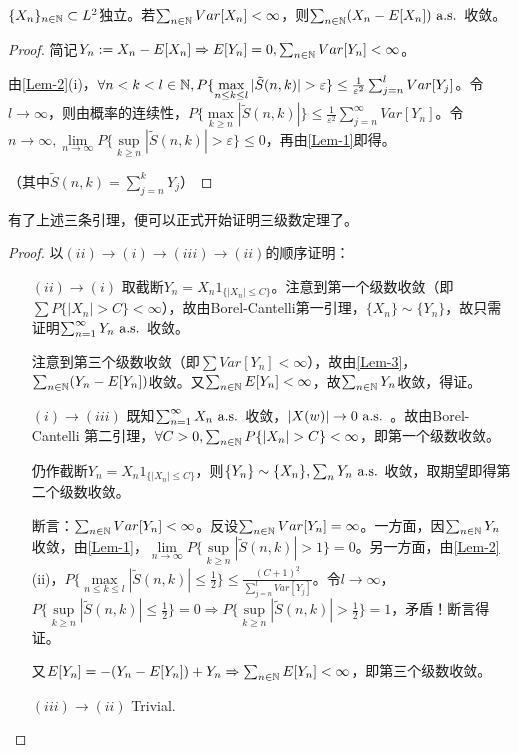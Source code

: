 \documentclass{ctexbook}
\begin{document}
\begin{Lemma}\label{Lem-3}
  $\{X_{n}\}_{n\in\mathbb{N}}\subset L^{2}$独立。若$\sum_{n\in\mathbb{N}}Var[X_{n}]<\infty$，则$\sum_{n\in\mathbb{N}}(X_{n}-E[X_{n}])\text{ a.s. }$收敛。
\end{Lemma}
\begin{proof}
 简记$Y_{n}:=X_{n}-E[X_{n}]\Rightarrow E[Y_{n}]=0,\sum_{n\in\mathbb{N}}Var[Y_{n}]<\infty$。

  由\ref{Lem-2}(i)，$\forall n<k<l\in\N, P\{\max\limits_{n\leq k\leq l}|\tilde S(n,k)|>\varepsilon\}\leq \frac{1}{\varepsilon^{2}}\sum_{j=n}^{l}Var[Y_{j}]$。令$l\to\infty$，则由概率的连续性，$P\{\max\limits_{k\geq n}|\tilde{S}(n,k)|\}\leq\frac{1}{\varepsilon^{2}}\sum_{j=n}^{\infty}Var[Y_{n}]$。令$n\to\infty, \lim\limits_{n\to\infty}P\{\sup\limits_{k\geq n}|\tilde{S}(n,k)|>\varepsilon\}\leq 0$，再由\ref{Lem-1}即得。
  
  （其中$\tilde S(n,k)=\sum_{j=n}^{k}Y_{j}$）
\end{proof}
有了上述三条引理，便可以正式开始证明三级数定理了。
\begin{proof}
以$(ii)\to(i)\to (iii)\to (ii)$的顺序证明：
  \begin{itemize}
  \item[$(ii)\to (i)$] 取截断$Y_{n}=X_{n}1_{\{|X_{n}|\leq C\}}$。注意到第一个级数收敛（即$\sum P\{|X_{n}|>C\}<\infty$），故由Borel-Cantelli第一引理，$\{X_{n}\}\sim \{Y_{n}\}$，故只需证明$\sum_{n=1}^{\infty}Y_{n}\text{ a.s. }$收敛。

    注意到第三个级数收敛（即$\sum Var[Y_{n}]<\infty$），故由\ref{Lem-3}，$\sum_{n\in\mathbb{N}}(Y_{n}-E[Y_{n}])$收敛。又$\sum_{n\in\mathbb{N}}E[Y_{n}]<\infty$，故$\sum_{n\in\mathbb{N}} Y_{n}$收敛，得证。

  \item[$(i)\to (iii)$] 既知$\sum_{n=1}^{\infty} X_{n}\text{ a.s. }$收敛，$|X(w)|\to 0\text{ a.s. }$。故由Borel-Cantelli 第二引理，$\forall C>0,\sum_{n\in\N} P\{|X_{n}|>C\}<\infty$，即第一个级数收敛。

    仍作截断$Y_{n}=X_{n}1_{\{|X_{n}|\leq C\}}$，则$\{Y_{n}\}\sim\{X_{n}\},\sum_{n}Y_{n}\text{ a.s. }$收敛，取期望即得第二个级数收敛。

    断言：$\sum_{n\in\mathbb{N}} Var[Y_{n}]<\infty$。反设$\sum_{n\in\mathbb{N}}Var[Y_{n}]=\infty$。一方面，因$\sum_{n\in\mathbb{N}} Y_{n}$收敛，由\ref{Lem-1}，$\lim\limits_{n\to\infty}P\{\sup\limits_{k\geq n}|\tilde{S}(n,k)|>1\}=0$。另一方面，由\ref{Lem-2}(ii)，$P\{\max\limits_{n\leq k\leq l}|\tilde{S}(n,k)|\leq\frac{1}{2}\}\leq\frac{(C+1)^{2}}{\sum_{j=n}^{l}Var[Y_{j}]}$。令$l\to\infty$，$P\{\sup\limits_{k\geq n}|\tilde S(n,k)|\leq \frac{1}{2}\}=0\Rightarrow P\{\sup\limits_{k\geq n}|\tilde{S}(n,k)|>\frac{1}{2}\}=1$，矛盾！断言得证。

    又$E[Y_{n}]=-(Y_{n}-E[Y_{n}])+Y_{n}\Rightarrow \sum_{n\in\mathbb{N}} E[Y_{n}]<\infty$，即第三个级数收敛。
  \item[$(iii)\to (ii)$] Trivial.
  \end{itemize}
  \end{proof}
\end{document}
